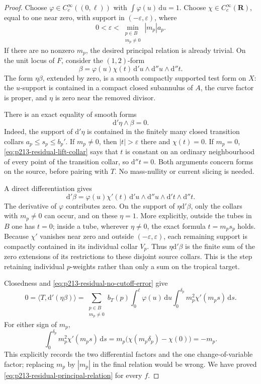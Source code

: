 \begin{proof}
Choose \(\varphi\in C_c^\infty((0,\ell))\) with
\(\int\varphi(u)\,\mathrm du=1\).
Choose \(\chi\in C_c^\infty(\mathbf R)\), equal to one near zero,
with support in \((-\varepsilon,\varepsilon)\), where
\[
 0<\varepsilon<
   \min_{\substack{p\in B\\m_p\neq0}} |m_p|a_p .
\]
If there are no nonzero \(m_p\), the desired principal relation
is already trivial. On the unit locus of \(F\), consider the
\((1,2)\)-form
\[
 \beta=\varphi(u)\chi(t)\,
        \mathrm d'u\wedge\mathrm d''u\wedge\mathrm d''t.
\]
The form \(\eta\beta\), extended by zero, is a smooth compactly
supported test form on \(X\): the \(u\)-support is contained
in a compact closed subannulus of \(A\), the curve factor is
proper, and \(\eta\) is zero near the removed divisor.

There is an exact equality of smooth forms
\begin{equation}
\label{eq:p213-residual-no-cutoff-error}
 \mathrm d'\eta\wedge\beta=0 .
\end{equation}
Indeed, the support of \(\mathrm d'\eta\) is contained in the
finitely many closed transition collars \(a_p\leq s_p\leq b_p'\).
If \(m_p\neq0\), then \(|t|>\varepsilon\) there and \(\chi(t)=0\).
If \(m_p=0\), \eqref{eq:p213-residual-lift-collar} says that
\(t\) is constant on an ordinary neighbourhood of every point
of the transition collar, so \(\mathrm d''t=0\).
Both arguments concern forms on the source, before pairing
with \(T\). No mass-nullity or current slicing is needed.

A direct differentiation gives
\[
 \mathrm d'\beta
  =\varphi(u)\chi'(t)\,
    \mathrm d'u\wedge\mathrm d''u\wedge
    \mathrm d't\wedge\mathrm d''t .
\]
The derivative of \(\varphi\) contributes zero.
On the support of \(\eta\mathrm d'\beta\), only the collars
with \(m_p\neq0\) can occur, and on these \(\eta=1\).
More explicitly, outside the tubes in \(B\) one has \(t=0\);
inside a tube, wherever \(\eta\neq0\), the exact formula
\(t=m_ps_p\) holds. Because \(\chi'\) vanishes near zero and
outside \((-\varepsilon,\varepsilon)\), each remaining support
is compactly contained in its individual collar \(V_p\).
Thus \(\eta\mathrm d'\beta\) is the finite sum of the zero
extensions of its restrictions to these disjoint source
collars. This is the step retaining individual \(p\)-weights
rather than only a sum on the tropical target.

Closedness and \eqref{eq:p213-residual-no-cutoff-error} give
\[
 0=\langle T,\mathrm d'(\eta\beta)\rangle
   =\sum_{\substack{p\in B\\m_p\neq0}}
       b_T(p)\int_0^\ell\varphi(u)\,\mathrm du
        \int_0^{\delta_p}
           m_p^2\chi'(m_ps)\,\mathrm ds .
\]
For either sign of \(m_p\),
\[
 \int_0^{\delta_p}m_p^2\chi'(m_ps)\,\mathrm ds
   =m_p\bigl(\chi(m_p\delta_p)-\chi(0)\bigr)=-m_p.
\]
This explicitly records the two differential factors and the
one change-of-variable factor; replacing \(m_p\) by \(|m_p|\)
in the final relation would be wrong. We have proved
\eqref{eq:p213-residual-principal-relation} for every \(f\).


\end{proof}
